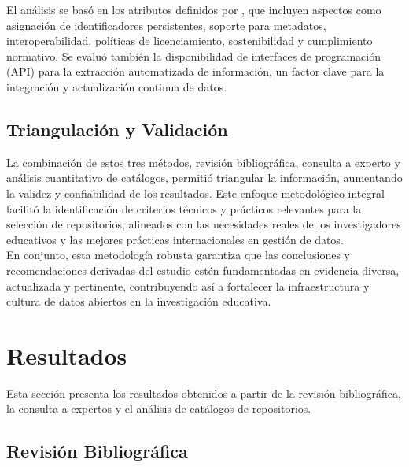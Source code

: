 \documentclass[runningheads]{llncs}
\begin{document}
El análisis se basó en los atributos definidos por \cite{witt_2024_11221855}, que incluyen aspectos como asignación de identificadores persistentes, soporte para metadatos, interoperabilidad, políticas de licenciamiento, sostenibilidad y cumplimiento normativo. Se evaluó también la disponibilidad de interfaces de programación (API) para la extracción automatizada de información, un factor clave para la integración y actualización continua de datos.\\

\subsection{Triangulación y Validación}
La combinación de estos tres métodos, revisión bibliográfica, consulta a experto y análisis cuantitativo de catálogos, permitió triangular la información, aumentando la validez y confiabilidad de los resultados. Este enfoque metodológico integral facilitó la identificación de criterios técnicos y prácticos relevantes para la selección de repositorios, alineados con las necesidades reales de los investigadores educativos y las mejores prácticas internacionales en gestión de datos.\\
En conjunto, esta metodología robusta garantiza que las conclusiones y recomendaciones derivadas del estudio estén fundamentadas en evidencia diversa, actualizada y pertinente, contribuyendo así a fortalecer la infraestructura y cultura de datos abiertos en la investigación educativa.\\

\section{Resultados}

Esta sección presenta los resultados obtenidos a partir de la revisión bibliográfica, la consulta a expertos y el análisis de catálogos de repositorios.

\subsection{Revisión Bibliográfica}
\end{document}
